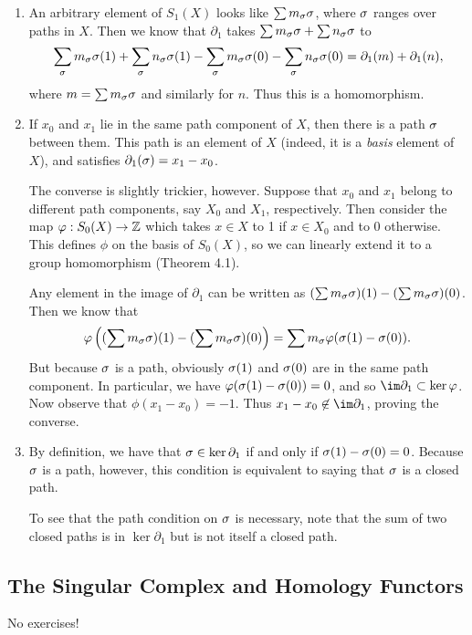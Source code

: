 \documentclass[../../solutions.tex]{subfiles}
\begin{document}
\begin{exercise} \leavevmode
\begin{enumerate}
\item An arbitrary element of $S_1(X)$ looks like $\sum m_\sigma\sigma$, where $\sigma$ ranges over paths in $X$. 
Then we know that $\partial_1$ takes $\sum m_\sigma\sigma+\sum n_\sigma\sigma$ to \[\sum_\sigma m_\sigma\sigma(1)+\sum_\sigma n_\sigma\sigma(1)-\sum_\sigma m_\sigma\sigma(0)-\sum_\sigma n_\sigma\sigma(0)=\partial_1(m)+\partial_1(n),\] where $m=\sum m_\sigma\sigma$ and similarly for $n$. 
Thus this is a homomorphism. 

\item If $x_0$ and $x_1$ lie in the same path component of $X$, then there is a path $\sigma$ between them. 
This path is an element of $X$ (indeed, it is a \textit{basis} element of $X$), and satisfies $\partial_1(\sigma)=x_1-x_0$. 

The converse is slightly trickier, however. 
Suppose that $x_0$ and $x_1$ belong to different path components, say $X_0$ and $X_1$, respectively. 
Then consider the map $\varphi:S_0(X)\to\mathbb{Z}$ which takes $x\in X$ to 1 if $x\in X_0$ and to 0 otherwise. 
This defines $\phi$ on the basis of $S_0(X)$, so we can linearly extend it to a group homomorphism (Theorem 4.1). 

Any element in the image of $\partial_1$ can be written as $(\sum m_\sigma\sigma)(1)-(\sum m_\sigma\sigma)(0)$. 
Then we know that \[\varphi\left((\sum m_\sigma\sigma)(1)-(\sum m_\sigma\sigma)(0)\right)=\sum m_\sigma\varphi(\sigma(1)-\sigma(0)).\] 
But because $\sigma$ is a path, obviously $\sigma(1)$ and $\sigma(0)$ are in the same path component. 
In particular, we have $\varphi(\sigma(1)-\sigma(0))=0$, and so $\im\partial_1\subset\ker\phi$. 
Now observe that $\phi(x_1-x_0)=-1$. 
Thus $x_1-x_0\not\in\im\partial_1$, proving the converse. 

\item By definition, we have that $\sigma\in\ker\partial_1$ if and only if $\sigma(1)-\sigma(0)=0$. 
Because $\sigma$ is a path, however, this condition is equivalent to saying that $\sigma$ is a closed path. 

To see that the path condition on $\sigma$ is necessary, note that the sum of two closed paths is in $\ker\partial_1$ but is not itself a closed path. 
\end{enumerate}
\end{exercise}

\subsection{The Singular Complex and Homology Functors}
No exercises! 
\end{document}
